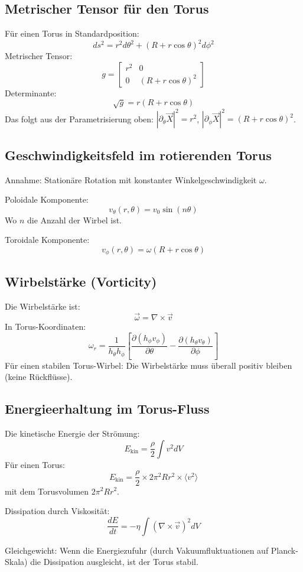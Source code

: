 	\subsection{Metrischer Tensor für den Torus}
	Für einen Torus in Standardposition:
	\[
	ds^2 = r^2 d\theta^2 + (R + r \cos \theta)^2 d\phi^2
	\]
	Metrischer Tensor:
	\[
	g = \begin{bmatrix}
		r^2 & 0 \\
		0 & (R + r \cos \theta)^2
	\end{bmatrix}
	\]
	Determinante:
	\[
	\sqrt{g} = r(R + r \cos \theta)
	\]
	Das folgt aus der Parametrisierung oben: $|\partial_\theta \vec{X}|^2 = r^2$, $|\partial_\phi \vec{X}|^2 = (R + r\cos\theta)^2$.

	\subsection{Geschwindigkeitsfeld im rotierenden Torus}
	Annahme: Stationäre Rotation mit konstanter Winkelgeschwindigkeit \( \omega \).
	
	Poloidale Komponente:
	\[
	v_\theta(r, \theta) = v_0 \sin(n \theta)
	\]
	Wo \( n \) die Anzahl der Wirbel ist.
	
	Toroidale Komponente:
	\[
	v_\phi(r, \theta) = \omega (R + r \cos \theta)
	\]
	
	\subsection{Wirbelstärke (Vorticity)}
	Die Wirbelstärke ist:
	\[
	\vec{\omega} = \nabla \times \vec{v}
	\]
	In Torus-Koordinaten:
	\[
	\omega_r = \frac{1}{h_\theta h_\phi} \left[ \frac{\partial (h_\phi v_\phi)}{\partial \theta} - \frac{\partial (h_\theta v_\theta)}{\partial \phi} \right]
	\]
	Für einen stabilen Torus-Wirbel: Die Wirbelstärke muss überall positiv bleiben (keine Rückflüsse).
	
	\subsection{Energieerhaltung im Torus-Fluss}
	Die kinetische Energie der Strömung:
	\[
	E_{\text{kin}} = \frac{\rho}{2} \int v^2 dV
	\]
	Für einen Torus:
	\[
	E_{\text{kin}} = \frac{\rho}{2} \times 2\pi^2 R r^2 \times \langle v^2 \rangle
	\]
	mit dem Torusvolumen $2\pi^2 R r^2$.

	Dissipation durch Viskosität:
	\[
	\frac{dE}{dt} = -\eta \int (\nabla \times \vec{v})^2 dV
	\]
	
	Gleichgewicht: Wenn die Energiezufuhr (durch Vakuumfluktuationen auf Planck-Skala) die Dissipation ausgleicht, ist der Torus stabil.
	
